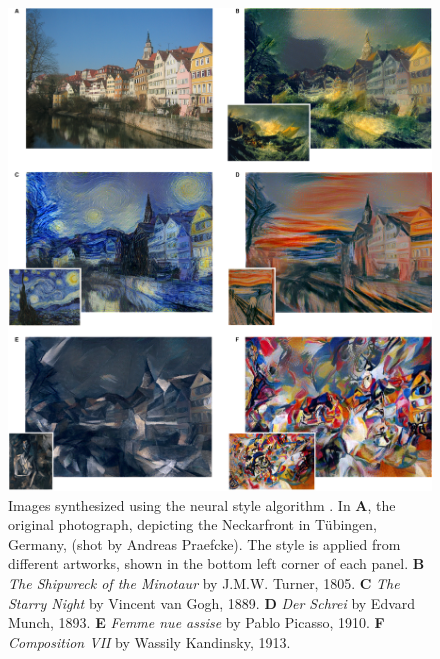 \begin{figure}[p]
  \includegraphics[width=\textwidth]{gfx/neural-style-examples}
  \caption{
    Images synthesized using the neural style algorithm \cite{Gatys2015B}.
    In \textbf{A}, the original photograph, depicting the Neckarfront in T\"ubingen, Germany, (shot by Andreas Praefcke).
    The style is applied from different artworks, shown in the bottom left corner of each panel.
    \textbf{B} \emph{The Shipwreck of the Minotaur} by J.M.W. Turner, 1805.
    \textbf{C} \emph{The Starry Night} by Vincent van Gogh, 1889.
    \textbf{D} \emph{Der Schrei} by Edvard Munch, 1893.
    \textbf{E} \emph{Femme nue assise} by Pablo Picasso, 1910.
    \textbf{F} \emph{Composition VII} by Wassily Kandinsky, 1913.
  }
  \label{sub:system:examples}
\end{figure}

